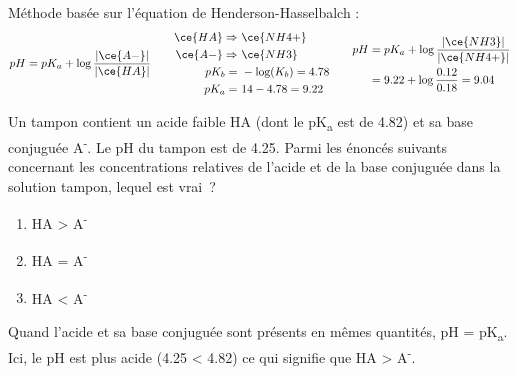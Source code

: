 \documentclass[
  11pt,
  a4paper,
  openany]{book}
\providecommand{\tightlist}{%
  \setlength{\itemsep}{0pt}\setlength{\parskip}{0pt}}
\begin{document}
\begin{Answer}
Méthode basée sur l'équation de Henderson-Hasselbalch :
\[
\begin{split}
  pH = pK_a + \log \frac{|\ce{A-}|}{|\ce{HA}|}
\end{split}
\qquad
\begin{split}
  \ce{HA} \Rightarrow &\ \ce{NH4+} \\
  \ce{A-} \Rightarrow &\ \ce{NH3} \\
  pK_b = &\ -\log(K_b) = 4.78 \\
  pK_a = &\ 14 - 4.78 = 9.22
\end{split}
\qquad
\begin{split}
  pH &= pK_a + \log \frac{|\ce{NH3}|}{|\ce{NH4+}|} \\
  &= 9.22 + \log \frac{0.12}{0.18} = 9.04 \\
\end{split}
\]

\end{Answer}

\clearpage

\begin{Exercise}

Un tampon contient un acide faible HA (dont le pK\textsubscript{a} est de 4.82) et sa base conjuguée A\textsuperscript{-}. Le pH du tampon est de 4.25. Parmi les énoncés suivants concernant les concentrations relatives de l'acide et de la base conjuguée dans la solution tampon, lequel est vrai~?

\begin{enumerate}
\def\labelenumi{\alph{enumi}.}
\tightlist
\item
  \textbar HA\textbar{} \textgreater{} \textbar A\textsuperscript{-}\textbar{}
\item
  \textbar HA\textbar{} = \textbar A\textsuperscript{-}\textbar{}
\item
  \textbar HA\textbar{} \textless{} \textbar A\textsuperscript{-}\textbar{}
\end{enumerate}

\end{Exercise}

\begin{Answer}
Quand l'acide et sa base conjuguée sont présents en mêmes quantités, pH = pK\textsubscript{a}. Ici, le pH est plus acide (4.25 \textless{} 4.82) ce qui signifie que \textbar HA\textbar{} \textgreater{} \textbar A\textsuperscript{-}\textbar.

\end{Answer}
\end{document}
